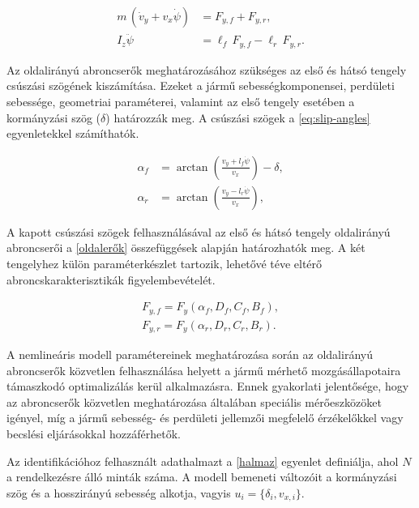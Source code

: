 \documentclass[12pt,a4paper,onehalfspacing, oneside]{book} %
\begin{document}
\begin{subequations}
	\label{eq:bicycle-dynamics}
	\begin{align}
		m\,(\dot v_y + v_x \dot{\psi}) &= F_{y,f} + F_{y,r}, \label{eq:lat-momentum} \\
		I_z \ddot{\psi} &= \ell_f\,F_{y,f} - \ell_r\,F_{y,r}. \label{eq:yaw-momentum}
	\end{align}
\end{subequations}

Az oldalirányú abroncserők meghatározásához szükséges az első és hátsó tengely csúszási szögének kiszámítása. Ezeket a jármű sebességkomponensei, perdületi sebessége, geometriai paraméterei, valamint az első tengely esetében a kormányzási szög ($\delta$) határozzák meg. A csúszási szögek a \ref{eq:slip-angles} egyenletekkel számíthatók.

\begin{subequations}
	\label{eq:slip-angles}
	\begin{align}
		\alpha_f &= \arctan \left( \frac{v_y + l_f \dot{\psi}}{v_x} \right) - \delta, \\
		\alpha_r &= \arctan \left( \frac{v_y - l_r \dot{\psi}}{v_x} \right),
	\end{align}
\end{subequations}

A kapott csúszási szögek felhasználásával az első és hátsó tengely oldalirányú abroncserői a \ref{oldalerők} összefüggések alapján határozhatók meg. A két tengelyhez külön paraméterkészlet tartozik, lehetővé téve eltérő abroncskarakterisztikák figyelembevételét.

\begin{subequations}
    \begin{align}
	F_{y,f} = F_y(\alpha_f, D_f, C_f, B_f), \\
	F_{y,r} = F_y(\alpha_r, D_r, C_r, B_r).
\end{align}
\label{oldalerők}
\end{subequations}

A nemlineáris modell paramétereinek meghatározása során az oldalirányú abroncserők közvetlen felhasználása helyett a jármű mérhető mozgásállapotaira támaszkodó optimalizálás kerül alkalmazásra. Ennek gyakorlati jelentősége, hogy az abroncserők közvetlen meghatározása általában speciális mérőeszközöket igényel, míg a jármű sebesség- és perdületi jellemzői megfelelő érzékelőkkel vagy becslési eljárásokkal hozzáférhetők.

Az identifikációhoz felhasznált adathalmazt a \ref{halmaz} egyenlet definiálja, ahol $N$ a rendelkezésre álló minták száma. A modell bemeneti változóit a kormányzási szög és a hosszirányú sebesség alkotja, vagyis $u_i = \{\delta_i, v_{x,i}\}$.
\end{document}
